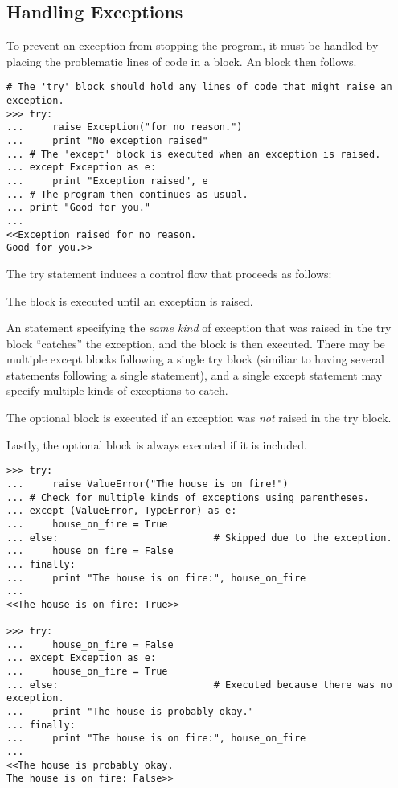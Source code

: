\subsection*{Handling Exceptions} %

To prevent an exception from stopping the program, it must be handled by
placing the problematic lines of code in a  block.
An  block then follows.

\begin{lstlisting}
# The 'try' block should hold any lines of code that might raise an exception.
>>> try:
...     raise Exception("for no reason.")
...     print "No exception raised"
... # The 'except' block is executed when an exception is raised.
... except Exception as e:
...     print "Exception raised", e
... # The program then continues as usual.
... print "Good for you."
...
<<Exception raised for no reason.
Good for you.>>
\end{lstlisting}
%
The try statement induces a control flow that proceeds as follows:
\begin{description}
\item The  block is executed until an exception is raised.
\item An  statement specifying the \emph{same kind} of exception that was raised in the try block ``catches'' the exception, and the block is then executed.
There may be multiple except blocks following a single try block (similiar to having several  statements following a single  statement), and a single except statement may specify multiple kinds of exceptions to catch.
\item The optional  block is executed if an exception was \emph{not} raised in the try block.
\item Lastly, the optional  block is always executed if it is included.
\end{description}

\begin{lstlisting}
>>> try:
...     raise ValueError("The house is on fire!")
... # Check for multiple kinds of exceptions using parentheses.
... except (ValueError, TypeError) as e:
...     house_on_fire = True
... else:                           # Skipped due to the exception.
...     house_on_fire = False
... finally:
...     print "The house is on fire:", house_on_fire
...
<<The house is on fire: True>>

>>> try:
...     house_on_fire = False
... except Exception as e:
...     house_on_fire = True
... else:                           # Executed because there was no exception.
...     print "The house is probably okay."
... finally:
...     print "The house is on fire:", house_on_fire
...
<<The house is probably okay.
The house is on fire: False>>
\end{lstlisting}

